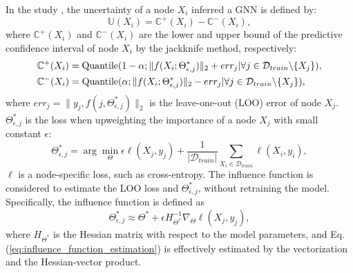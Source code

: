 In the study \cite{kang2022jurygcn}, 
the uncertainty of a node $X_i$ inferred a GNN is defined by:
\begin{equation}
    \mathbb{U}(X_i)=\mathbb{C}^+(X_i) - \mathbb{C}^-(X_i),
\end{equation}
where $\mathbb{C}^+(X_i) $ and $ \mathbb{C}^-(X_i)$ are the lower and upper bound of the predictive confidence interval of node $X_i$ by the jackknife method, respectively:
\begin{equation}
\begin{aligned}
    & \mathbb{C}^+(X_i) = \textnormal{Quantile}(1-\alpha; \|f(X_i;\Theta^\ast_{\epsilon,j})\|_2 + err_j | \forall j \in \mathcal{D}_{train} \backslash \{ X_j \}), \\
    & \mathbb{C}^-(X_i) = \textnormal{Quantile}(\alpha; \|f(X_i;\Theta^\ast_{\epsilon,j})\|_2 - err_j | \forall j \in \mathcal{D}_{train} \backslash \{ X_j \}),
\end{aligned}
\end{equation}
where $err_j = \| y_j, f(j, \Theta_{\epsilon,j}^\ast) \|_2$ is the leave-one-out (LOO) error of node $X_j$.
$\Theta_{\epsilon,j}^\ast$ is the loss when upweighting the importance of a node $X_j$ with small constant $\epsilon$:
\begin{equation}
    \Theta_{\epsilon,j}^\ast=\arg\min_\Theta \epsilon \ell(X_j, y_j) + \frac{1}{|\mathcal{D}_{train}|} \sum_{X_i \in \mathcal{D}_{train}} \ell(X_i, y_i),
\end{equation} 
$\ell$ is a node-specific loss, such as cross-entropy.
The influence function is considered to estimate the LOO loss and $\Theta_{\epsilon,j}^\ast$, without retraining the model.
Specifically, 
the influence function is defined as
\begin{equation}
\label{eq:influence_function_estimation}
    \Theta_{\epsilon,j}^\ast \approx \Theta^\ast + \epsilon H^{-1}_{\Theta^\ast} \nabla_{\Theta} \ell(X_j, y_j),
\end{equation}
where $H_{\Theta^\ast}$ is the Hessian matrix with respect to the model parameters, and Eq. (\ref{eq:influence_function_estimation}) is effectively estimated by the vectorization and the Hessian-vector product.

